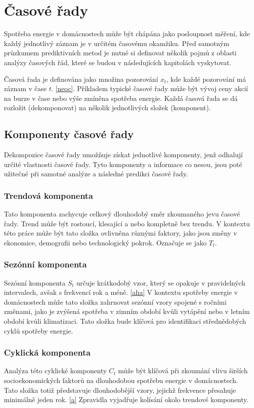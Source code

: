 \documentclass[FM,BP,fonts]{tulthesis}
\begin{document}
\chapter{Časové řady}
Spotřeba energie v domácnostech může být chápána jako posloupnost měření, kde každý jednotlivý záznam je v určitém časovému okamžiku. Před samotným průzkumem prediktivních metod je nutné si definovat několik pojmů z oblasti analýzy časových řád, které se budou v následujících kapitolách vyskytovat.

Časová řada je definována jako množina pozorování $x_t$, kde každé pozorování má záznam v čase $t$. \ref{neoc}. Příkladem typické časové řady může být vývoj ceny akcií na burze v čase nebo výše zmíněna spotřeba energie. Každá časová řada se dá rozložit (dekomponovat) na několik jednotlivých složek (komponent). 


\section{Komponenty časové řady}
Dekompozice časové řady umožňuje získat jednotlivé komponenty, jenž odhalují určité vlastnosti časové řady. Tyto komponenty a informace co nesou, jsou poté užitečné při samotné analýze a následné predikci časové řady.

\subsection{Trendová komponenta}
Tato komponenta zachycuje celkový dlouhodobý směr zkoumaného jevu časové řady. Trend může být rostoucí, klesající a nebo kompletně bez trendu. V kontextu této práce může být tato složka ovlivněna různými faktory, jako jsou změny v ekonomice, demografii nebo technologický pokrok. Označuje se jako $T_t$.

\subsection{Sezónní komponenta}
Sezónní komponenta $S_t$ určuje krátkodobý vzor, který se opakuje v pravidelných intervalech, avšak s frekvencí rok a méně. \ref{aha} V kontextu spotřeby energie v domácnostech může tato složka zahrnovat sezónní vzory spojené s ročními změnami, jako je zvýšená spotřeba v zimním období kvůli vytápění nebo v letním období kvůli klimatizaci. Tato složka bude klíčová pro identifikaci střednědobých cyklů spotřeby energie.

\subsection{Cyklická komponenta}
Analýza této cyklické komponenty $C_t$ může být klíčová při zkoumání vlivu širších socioekonomických faktorů na dlouhodobou spotřebu energie v domácnostech. Tato složka totiž představuje dlouhodobější vzory, jejichž frekvence přesahuje minimálně jeden rok. \ref{a} Zpravidla vyjadřuje kolísání okolo trendové komponenty.
\end{document}
